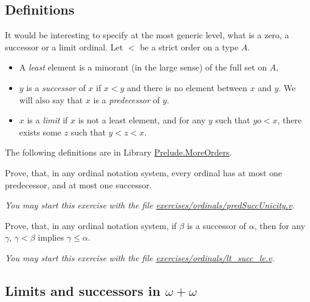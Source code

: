 \subsection{Definitions}
It would be interesting to specify at the most generic level, what is a zero, a successor or a limit ordinal. Let $<$ be a strict order on a type $A$.

\begin{itemize}
\item A \emph{least} element is a minorant (in the large sense) of the full set  on $A$,
\item $y$ is a \emph{successor} of $x$ if $x<y$ and there is no element between $x$ and $y$. We will also say that $x$ is a \emph{predecessor} of $y$.
\item $x$ is a \emph{limit} if $x$ is not a least element, and for any $y$ such that $yo<x$,
 there exists some $z$ such that $y<z<x$.
\end{itemize}


The following definitions are in Library \href{../theories/html/hydras.Prelude.MoreOrders.html}{Prelude.MoreOrders}.




\begin{exercise}
Prove, that, in any ordinal notation system, every ordinal has at most one predecessor, and at most one successor. 

\emph{You may start this exercise with the file
\href{https://github.com/coq-community/hydra-battles/blob/master/exercises/ordinals/predSuccUnicity.v}{exercises/ordinals/predSuccUnicity.v}.}

\end{exercise}

\begin{exercise}
Prove, that, in any ordinal notation system, if $\beta$ is a successor of $\alpha$,
then for any $\gamma$, $\gamma<\beta$ implies 
$\gamma\leq\alpha$.

\emph{You may start this exercise with the file
\href{https://github.com/coq-community/hydra-battles/blob/master/exercises/ordinals/lt_succ_le.v}{exercises/ordinals/lt\_succ\_le.v}.}
\end{exercise}




\subsection{Limits and successors in \texorpdfstring{$\omega+\omega$}{omega+omega}}

